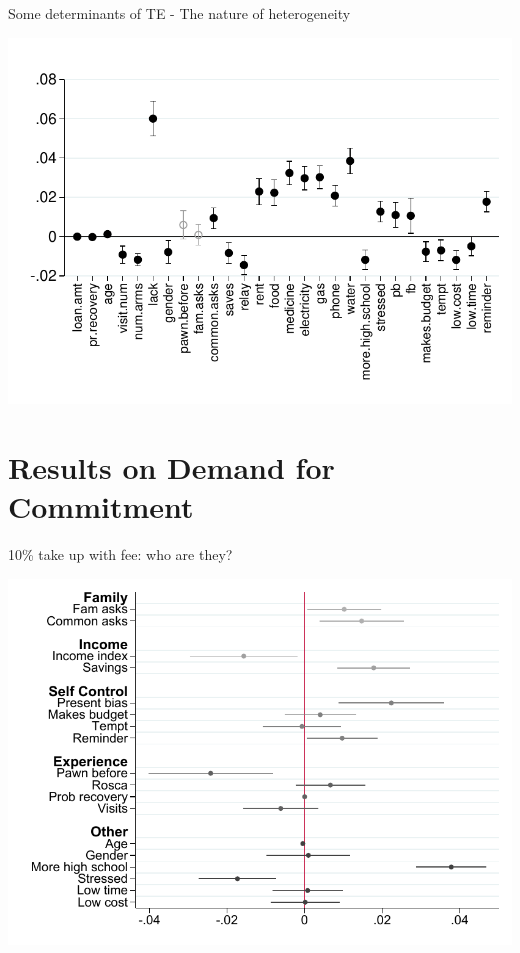 \documentclass[9pt]{beamer}
\begin{document}
\begin{frame}{Some determinants of TE - The nature of heterogeneity}
    \begin{center}
        \includegraphics[width=.9\textwidth]{Figuras/HE/he_int_des_c_pro_2.pdf}
    \end{center}
\end{frame}




\section{Results on Demand for Commitment}

\begin{frame}{10\% take up with fee: who are they?}
    \begin{center}
        \includegraphics[width=.90\textwidth]{Figuras/pago_frec_vol_fee_interactions_rf.pdf}
    \end{center}
\end{frame}
\end{document}
